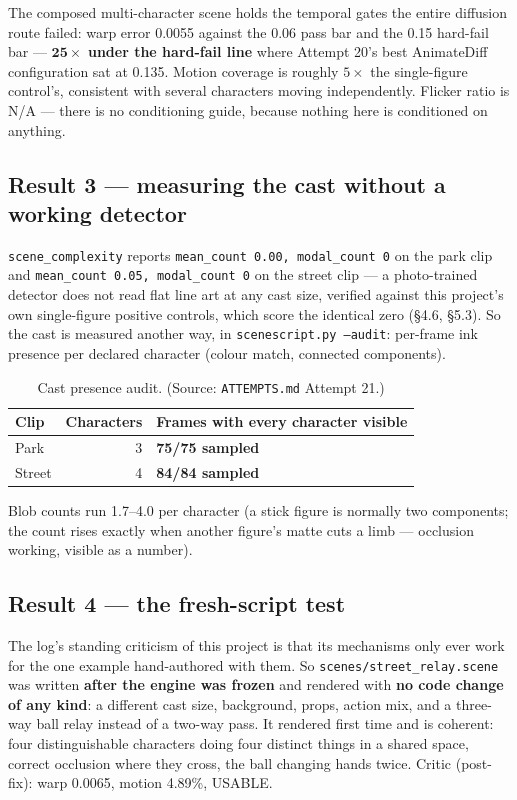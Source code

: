 \documentclass[11pt]{article}
\newcommand{\secsym}{\S}
\begin{document}
The composed multi-character scene holds the temporal gates the entire
diffusion route failed: warp error 0.0055 against the 0.06 pass bar and
the 0.15 hard-fail bar --- $\mathbf{25\times}$ \textbf{under the
hard-fail line} where Attempt 20's best AnimateDiff configuration sat at
0.135. Motion coverage is roughly $5\times$ the single-figure control's,
consistent with several characters moving independently. Flicker ratio is
N/A --- there is no conditioning guide, because nothing here is
conditioned on anything.

\subsection{Result 3 --- measuring the cast without a working detector}
\label{sec:a21result3}

\texttt{scene\_complexity} reports \texttt{mean\_count 0.00, modal\_count
0} on the park clip and \texttt{mean\_count 0.05, modal\_count 0} on the
street clip --- a photo-trained detector does not read flat line art at
any cast size, verified against this project's own single-figure positive
controls, which score the identical zero (\secsym4.6, \secsym5.3). So the
cast is measured another way, in \texttt{scenescript.py --audit}:
per-frame ink presence per declared character (colour match, connected
components).

\begin{table}[h]
\centering
\caption{Cast presence audit. (Source: \texttt{ATTEMPTS.md} Attempt 21.)}
\label{tab:a21audit}
\begin{tabular}{@{}lrl@{}}
\toprule
Clip & Characters & Frames with every character visible \\
\midrule
Park & 3 & \textbf{75/75 sampled} \\
Street & 4 & \textbf{84/84 sampled} \\
\bottomrule
\end{tabular}
\end{table}

Blob counts run 1.7--4.0 per character (a stick figure is normally two
components; the count rises exactly when another figure's matte cuts a
limb --- occlusion working, visible as a number).

\subsection{Result 4 --- the fresh-script test}
\label{sec:a21result4}

The log's standing criticism of this project is that its mechanisms only
ever work for the one example hand-authored with them. So
\texttt{scenes/street\_relay.scene} was written \textbf{after the engine
was frozen} and rendered with \textbf{no code change of any kind}: a
different cast size, background, props, action mix, and a three-way ball
relay instead of a two-way pass. It rendered first time and is coherent:
four distinguishable characters doing four distinct things in a shared
space, correct occlusion where they cross, the ball changing hands twice.
Critic (post-fix): warp 0.0065, motion 4.89\%, USABLE.
\end{document}
